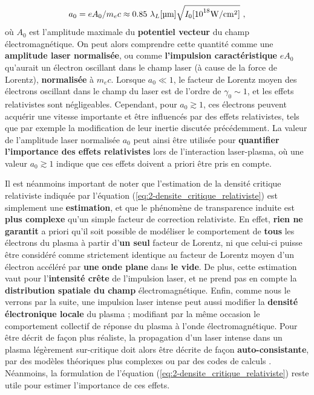 \begin{refsection}
\begin{equation}
    a_0 = e A_0/m_e c \approx 0.85 ~ \lambda_L \si{[\um]} \sqrt{I_0 \si{[10^{18} \W\per\cm^2]}} ~ \rm ,
    \label{eq:2-a0_definition}
\end{equation}
où $A_0$ est l'amplitude maximale du \textbf{potentiel vecteur} du champ électromagnétique. On peut alors comprendre cette quantité comme une \textbf{amplitude laser normalisée}, ou comme \textbf{l'impulsion caractéristique} $eA_0$ qu'aurait un électron oscillant dans le champ laser (à cause de la force de Lorentz), \textbf{normalisée} à $m_e c$. Lorsque $a_0 \ll 1$, le facteur de Lorentz moyen des électrons oscillant dans le champ du laser est de l'ordre de $\gamma_0 \sim 1$, et les effets relativistes sont négligeables. Cependant, pour $a_0 \gtrsim 1$, ces électrons peuvent acquérir une vitesse importante et être influencés par des effets relativistes, tels que par exemple la modification de leur inertie discutée précédemment. La valeur de l'amplitude laser normalisée $a_0$ peut ainsi être utilisée pour \textbf{quantifier l'importance des effets relativistes} lors de l'interaction laser-plasma, où une valeur $a_0 \gtrsim 1$ indique que ces effets doivent a priori être pris en compte.

Il est néanmoins important de noter que l'estimation de la densité critique relativiste indiquée par l'équation (\ref{eq:2-densite_critique_relativiste}) est simplement une \textbf{estimation}, et que le phénomène de transparence induite est \textbf{plus complexe} qu'un simple facteur de correction relativiste. En effet, \textbf{rien ne garantit} a priori qu'il soit possible de modéliser le comportement de \textbf{tous} les électrons du plasma à partir d'\textbf{un seul} facteur de Lorentz, ni que celui-ci puisse être considéré comme strictement identique au facteur de Lorentz moyen d'un électron accéléré par \textbf{une onde plane} dans \textbf{le vide}. De plus, cette estimation vaut pour l'\textbf{intensité crête} de l'impulsion laser, et ne prend pas en compte la \textbf{distribution spatiale du champ} électromagnétique. Enfin, comme nous le verrons par la suite, une impulsion laser intense peut aussi modifier la \textbf{densité électronique locale} du plasma ; modifiant par la même occasion le comportement collectif de réponse du plasma à l'onde électromagnétique. Pour être décrit de façon plus réaliste, la propagation d'un laser intense dans un plasma légèrement sur-critique doit alors être décrite de façon \textbf{auto-consistante}, par des modèles théoriques plus complexes ou par des codes de calculs \parencite{macchi_2012}. Néanmoins, la formulation de l'équation (\ref{eq:2-densite_critique_relativiste}) reste utile pour estimer l'importance de ces effets.


\end{refsection}
